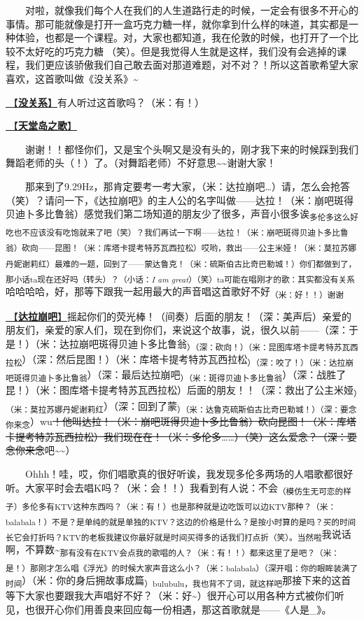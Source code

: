 \documentclass[]{ctexbook}
\begin{document}
  对啦，就像我们每个人在我们的人生道路行走的时候，一定会有很多不开心的事情。那可能就像是打开一盒巧克力糖一样，就你拿到什么样的味道，其实都是一种体验，也都是一个课程。对，大家也都知道，我在伦敦的时候，也打开了一个比较不太好吃的巧克力糖🍫（笑）。但是我觉得人生就是这样，我们没有会逃掉的课程，我们更应该骄傲我们自己敢去面对那道难题，对不对？！所以这首歌希望大家喜欢，这首歌叫做《没关系》\textasciitilde{}

\hyperref[life-is-like-a-box-of-chocolates]{🎵【\textbf{没关系}】}有人听过这首歌吗？（米：有！）

\hyperref[haven-song]{🎵【\textbf{天堂岛之歌}】}

  谢谢！！都怪你们，又是宝个头啊又是没有头的，刚才我下来的时候踩到我们舞蹈老师的头（！）了。（对舞蹈老师）不好意思\textasciitilde\textasciitilde 谢谢大家！

  那来到了9.29Hz，那肯定要考一考大家，（米：达拉崩吧\ldots）请，怎么会抢答（笑）？请问一下，《达拉崩吧》的主人公的名字叫做------达拉！（米：崩吧斑得贝迪卜多比鲁翁）感觉我们第二场知道的朋友少了很多，声音小很多诶\textsubscript{多伦多这么好吃也不应该没有吃饱就来了吧（笑）？我们再试一下啊------达拉！（米：崩吧斑得贝迪卜多比鲁翁）砍向------昆图！（米：库塔卡提考特苏瓦西拉松）哎哟，救出------公主米娅！（米：莫拉苏娜丹妮谢莉红）最难的一题，回到了------蒙达鲁克！（米：硫斯伯古比奇巴勒城！）你们都做到了，那小话ta现在还好吗（转头）？（小话：\emph{I am great}）（笑）ta可能在唱刚才的歌：其实都没有关系}哈哈哈哈，好，那等下跟我一起用最大的声音唱这首歌好不好\textsubscript{（米：好！！）谢谢}

\hyperref[dalabengba]{🎵【\textbf{达拉崩吧}】}摇起你们的荧光棒！（间奏）后面的朋友！（深：美声后）亲爱的朋友们，亲爱的家人们，现在到你们，来说这个故事，说，很久以前------（深：于是！）（米：达拉崩吧斑得贝迪卜多比鲁翁\textsubscript{）（深：砍向！）（米：昆图库塔卡提考特苏瓦西拉松}）（深：然后昆图！）（米：库塔卡提考特苏瓦西拉松\textsubscript{）（深：咬了！）（米：达拉崩吧斑得贝迪卜多比鲁翁}）（深：最后达拉崩吧\textsubscript{）（米：斑得贝迪卜多比鲁翁}）（深：战胜了昆！）（米：图库塔卡提考特苏瓦西拉松）后面的朋友！！（深：救出了公主米娅\textsubscript{）（米：莫拉苏娜丹妮谢莉红}）（深：回到了蒙\textsubscript{）（米：达鲁克硫斯伯古比奇巴勒城！）（深：要念你来念}）wu\st{！他叫达拉！（米：崩吧斑得贝迪卜多比鲁翁）砍向昆图！（米：库塔卡提考特苏瓦西拉松）我们现在在！（米：多伦多\ldots\ldots）（笑）这么爱念？（深：要念你来念}吧\textasciitilde\textasciitilde）

  Ohhh！哇，哎，你们唱歌真的很好听诶，我发现多伦多两场的人唱歌都很好听。大家平时会去唱K吗？（米：会！！）我看到有人说：不会\textsubscript{（模仿生无可恋的样子）多伦多有KTV这种东西吗？（米：有！）也是那种就是边吃饭可以边KTV那种？（米：balabala！）不是？是单纯的就是单独的KTV？这边的价格是什么？是按小时算的是吗？买的时间长它会打折吗？KTV的老板我建议你最好就是时间买得多的话我们打点折（笑）。当然啦}我说话啊，不算数\textasciitilde{}\textsubscript{那有没有在KTV会点我的歌唱的人？（米：有！！）都来这里了是吧？（米：是！）那刚才怎么唱《浮光》的时候大家声音这么小？（米：balabala）（深开唱：你的眼眸装满了时间}）（米：你的身后拥故事成篇\textsubscript{）bulubulu，我也背不了词，就这样吧}那接下来的这首等下大家也要跟我大声唱好不好？（米：好\textasciitilde）很开心可以用各种方式被你们听见，也很开心你们用善良来回应每一份相遇，那这首歌就是------《人是\_》。
\end{document}
